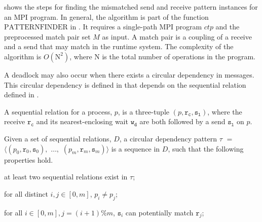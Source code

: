  shows the steps for finding the mismatched send and receive pattern instances for an MPI program. In general, the algorithm is part of the function $\mathrm{PATTERNFINDER}$ in . It requires a single-path MPI program $\mathit{ctp}$ and the preprocessed match pair set $\mathit{M}$ as input. A match pair is a coupling of a receive and a send that may match in the runtime system.
The complexity of the algorithm is $O(\mathrm{N}^2)$, where $\mathrm{N}$ is the total number of operations in the program. 

A deadlock may also occur when there exists a circular dependency in messages. This circular dependency is defined in  that depends on the sequential relation defined in .

\begin{definition}
A sequential relation for a process, $p$, is a three-tuple $(p, \mathtt{r_c}, \mathtt{s_l})$, where the receive $\mathtt{r_c}$ and its nearest-enclosing wait $\mathtt{w_d}$ are both followed by a send $\mathtt{s_l}$ on $p$. 
\label{def:seqrelation}
\end{definition}

\begin{definition}
Given a set of sequential relations, $D$, a circular dependency pattern $\tau$ $=$ $\langle(p_0, \mathtt{r}_0, \mathtt{s}_0),$ $\ldots,$ $(p_m, \mathtt{r}_m, \mathtt{s}_m)\rangle$ is a sequence in $D$, such that the following properties hold.
\begin{compactenum}
\item at least two sequential relations exist in $\tau$;
\item for all distinct $i,j \in [0,m]$, $p_i \neq p_j$;
\item for all $i \in [0,m], j = (i+1) \% m$, $\mathtt{s}_i$ can potentially match $\mathtt{r}_j$;
\end{compactenum}
\label{def:circular}
\end{definition}

